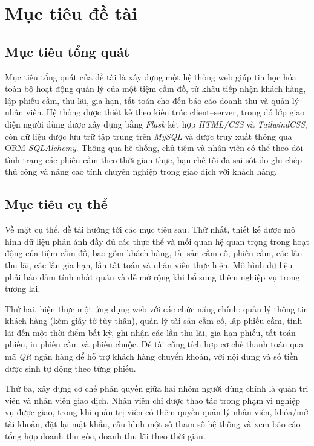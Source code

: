 \documentclass[13pt,a4paper]{extreport}
\begin{document}
\section{Mục tiêu đề tài}

\subsection{Mục tiêu tổng quát}

Mục tiêu tổng quát của đề tài là xây dựng một hệ thống web giúp tin học hóa toàn bộ hoạt động quản lý của một tiệm cầm đồ, từ khâu tiếp nhận khách hàng, lập phiếu cầm, thu lãi, gia hạn, tất toán cho đến báo cáo doanh thu và quản lý nhân viên. Hệ thống được thiết kế theo kiến trúc client--server, trong đó lớp giao diện người dùng được xây dựng bằng \emph{Flask} kết hợp \emph{HTML/CSS} và \emph{TailwindCSS}, còn dữ liệu được lưu trữ tập trung trên \emph{MySQL} và được truy xuất thông qua ORM \emph{SQLAlchemy}. Thông qua hệ thống, chủ tiệm và nhân viên có thể theo dõi tình trạng các phiếu cầm theo thời gian thực, hạn chế tối đa sai sót do ghi chép thủ công và nâng cao tính chuyên nghiệp trong giao dịch với khách hàng.

\subsection{Mục tiêu cụ thể}

Về mặt cụ thể, đề tài hướng tới các mục tiêu sau. Thứ nhất, thiết kế được mô hình dữ liệu phản ánh đầy đủ các thực thể và mối quan hệ quan trọng trong hoạt động của tiệm cầm đồ, bao gồm khách hàng, tài sản cầm cố, phiếu cầm, các lần thu lãi, các lần gia hạn, lần tất toán và nhân viên thực hiện. Mô hình dữ liệu phải bảo đảm tính nhất quán và dễ mở rộng khi bổ sung thêm nghiệp vụ trong tương lai.

Thứ hai, hiện thực một ứng dụng web với các chức năng chính: quản lý thông tin khách hàng (kèm giấy tờ tùy thân), quản lý tài sản cầm cố, lập phiếu cầm, tính lãi đến một thời điểm bất kỳ, ghi nhận các lần thu lãi, gia hạn phiếu, tất toán phiếu, in phiếu cầm và phiếu chuộc. Đề tài cũng tích hợp cơ chế thanh toán qua mã \emph{QR} ngân hàng để hỗ trợ khách hàng chuyển khoản, với nội dung và số tiền được sinh tự động theo từng phiếu.

Thứ ba, xây dựng cơ chế phân quyền giữa hai nhóm người dùng chính là quản trị viên và nhân viên giao dịch. Nhân viên chỉ được thao tác trong phạm vi nghiệp vụ được giao, trong khi quản trị viên có thêm quyền quản lý nhân viên, khóa/mở tài khoản, đặt lại mật khẩu, cấu hình một số tham số hệ thống và xem báo cáo tổng hợp doanh thu gốc, doanh thu lãi theo thời gian.
\end{document}
